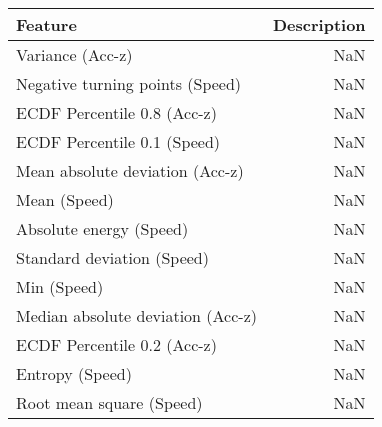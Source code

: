 \begin{table}
\centering
\label{table:reg_fs}
\begin{tabular}{lr}
\toprule
                 \textbf{Feature} & \textbf{Description} \\
\midrule
                 Variance (Acc-z) &                  NaN \\
  Negative turning points (Speed) &                  NaN \\
      ECDF Percentile 0.8 (Acc-z) &                  NaN \\
      ECDF Percentile 0.1 (Speed) &                  NaN \\
  Mean absolute deviation (Acc-z) &                  NaN \\
                     Mean (Speed) &                  NaN \\
          Absolute energy (Speed) &                  NaN \\
       Standard deviation (Speed) &                  NaN \\
                      Min (Speed) &                  NaN \\
Median absolute deviation (Acc-z) &                  NaN \\
      ECDF Percentile 0.2 (Acc-z) &                  NaN \\
                  Entropy (Speed) &                  NaN \\
         Root mean square (Speed) &                  NaN \\
\bottomrule
\end{tabular}
\end{table}
